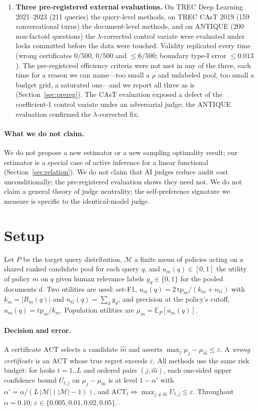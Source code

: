\documentclass{article}
\newcommand{\eps}{\varepsilon}
\newcommand{\ACT}{\mathrm{ACT}}
\begin{document}
\begin{enumerate}
\item \textbf{Three pre-registered external evaluations.} On TREC Deep Learning 2021--2023 (211 queries) the query-level methods, on TREC CAsT 2019 (159 conversational turns) the document-level methods, and on ANTIQUE (200 non-factoid questions) the $\lambda$-corrected control variate were evaluated under locks committed before the data were touched. Validity replicated every time (wrong certificates $0/500$, $0/500$ and $\le6/500$; boundary type-I error $\le0.013$). The pre-registered efficiency criteria were not met in any of the three, each time for a reason we can name---too small a $\rho$ and unlabeled pool, too small a budget grid, a saturated one---and we report all three as is (Section~\ref{sec:prereg}). The CAsT evaluation exposed a defect of the coefficient-1 control variate under an adversarial judge; the ANTIQUE evaluation confirmed the $\lambda$-corrected fix.
\end{enumerate}

\paragraph{What we do not claim.} We do not propose a new estimator or a new sampling optimality result; our estimator is a special case of active inference for a linear functional (Section~\ref{sec:relation}). We do not claim that AI judges reduce audit cost unconditionally; the pre-registered evaluation shows they need not. We do not claim a general theory of judge neutrality; the self-preference signature we measure is specific to the identical-model judge.

\section{Setup}\label{sec:setup}
Let $P$ be the target query distribution, $\mathcal{M}$ a finite menu of policies acting on a shared ranked candidate pool for each query $q$, and $u_m(q)\in[0,1]$ the utility of policy $m$ on $q$ given human relevance labels $y_d\in\{0,1\}$ for the pooled documents $d$. Two utilities are used: set-F1, $u_m(q)=2\,\mathrm{tp}_m/(k_m+n_G)$ with $k_m=|R_m(q)|$ and $n_G(q)=\sum_d y_d$, and precision at the policy's cutoff, $u_m(q)=\mathrm{tp}_m/k_m$. Population utilities are $\mu_m=\mathbb{E}_P[u_m(q)]$.

\paragraph{Decision and error.} A certificate $\ACT$ selects a candidate $\hat m$ and asserts $\max_{j}\mu_j-\mu_{\hat m}\le\eps$. A \emph{wrong certificate} is an $\ACT$ whose true regret exceeds $\eps$. All methods use the same risk budget: for looks $t=1..L$ and ordered pairs $(j,\hat m)$, each one-sided upper confidence bound $U_{t,j}$ on $\mu_j-\mu_{\hat m}$ is at level $1-\alpha'$ with $\alpha'=\alpha/(L\,|\mathcal M|(|\mathcal M|-1))$, and $\ACT_t\iff\max_{j\ne\hat m}U_{t,j}\le\eps$. Throughout $\alpha=0.10$; $\eps\in\{0.005,0.01,0.02,0.05\}$.
\end{document}
